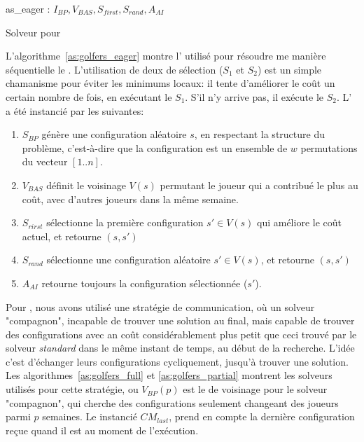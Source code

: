 \begin{algorithm}
\dontprintsemicolon
\SetNoline
{}
   as\_eager\;
\algoindent {} : $I_{BP}, V_{BAS}, S_{first}, S_{rand}, A_{AI}$ \;
\caption{Solveur pour \SGP}\label{as:golfers_eager}
\end{algorithm}

L'algorithme~\ref{as:golfers_eager} montre l'\as{} utilisé pour résoudre me manière séquentielle le \SGP{}. L'utilisation de deux \ms{} de sélection ($S_1$ et $S_2$) est un simple chamanisme pour éviter les minimums locaux: il tente d'améliorer le coût un certain nombre de fois, en exécutant le \om{} $S_1$. S'il n'y arrive pas, il exécute le \om{} $S_2$. L'\as{} a été instancié par les \oms{} suivantes:

\begin{enumerate}
\item $S_{BP}$ génère une configuration aléatoire $s$, en respectant la structure du problème, c'est-à-dire que la configuration est un ensemble de $w$ permutations du vecteur $[1..n]$.
\item $V_{BAS}$ définit le voisinage $V \left(s\right)$ permutant le joueur qui a contribué le plus au coût, avec d'autres joueurs dans la même semaine.
\item $S_{rirst}$ sélectionne la première configuration $s'\in V\left (s\right)$ qui améliore le coût actuel, et retourne $(s, s')$
\item $S_{rand}$ sélectionne une configuration aléatoire $s'\in V\left(s\right)$, et retourne $(s, s')$
\item $A_{AI}$ retourne toujours la configuration sélectionnée ($s'$).
\end{enumerate}

Pour \SGP{}, nous avons utilisé une stratégie de communication, où un solveur "compagnon", incapable de trouver une solution au final, mais capable de trouver des configurations avec an coût considérablement plus petit que ceci trouvé par le solveur \textit{standard} dans le même instant de temps, au début de la recherche. L'idée c'est d'échanger leurs configurations cycliquement, jusqu'à trouver une solution. Les algorithmes~\ref{as:golfers_full} et \ref{as:golfers_partial} montrent les solveurs utilisés pour cette stratégie, ou $V_{BP}(p)$ est le \om{} de voisinage pour le solveur "compagnon", qui cherche des configurations seulement changeant des joueurs parmi $p$ semaines. Le \opch{} instancié $CM_{last}$, prend en compte la dernière configuration reçue quand il est au moment de l'exécution.

